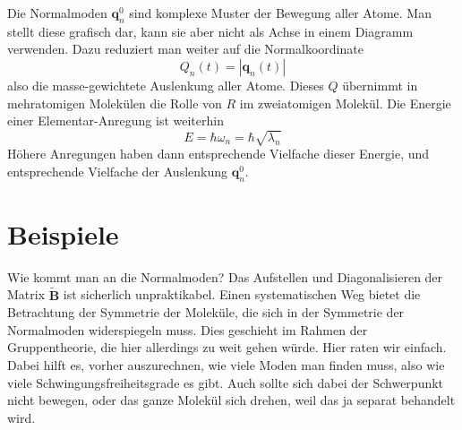 Die Normalmoden $\mathbf{q}_n^0$ sind komplexe Muster der Bewegung aller Atome. Man stellt diese grafisch dar, kann sie aber nicht als Achse in einem Diagramm verwenden. Dazu reduziert man weiter auf die Normalkoordinate
\begin{equation}
Q_n(t) = | \mathbf{q}_n (t) |
\end{equation}
also die masse-gewichtete Auslenkung aller Atome. Dieses $Q$ übernimmt in mehratomigen Molekülen die Rolle von $R$ im zweiatomigen Molekül. Die Energie einer Elementar-Anregung ist weiterhin 
\begin{equation}
E = \hbar \omega_n = \hbar	\sqrt{\lambda_n}
\end{equation}
Höhere Anregungen haben dann entsprechende Vielfache dieser Energie, und entsprechende Vielfache der Auslenkung 
 $\mathbf{q}_n^0$.


\section{Beispiele}

Wie kommt man an die Normalmoden? Das Aufstellen und Diagonalisieren der Matrix  $\tilde{\mathbf{B}} $ ist sicherlich unpraktikabel. Einen systematischen Weg bietet die Betrachtung der Symmetrie der Moleküle, die sich in der Symmetrie der Normalmoden widerspiegeln muss. Dies geschieht im Rahmen der Gruppentheorie, die hier allerdings zu weit gehen würde. Hier raten wir einfach. Dabei hilft es, vorher auszurechnen, wie viele Moden man finden muss, also wie viele Schwingungsfreiheitsgrade es gibt. Auch sollte sich dabei der Schwerpunkt nicht bewegen, oder das ganze Molekül sich drehen, weil das ja separat behandelt wird.

